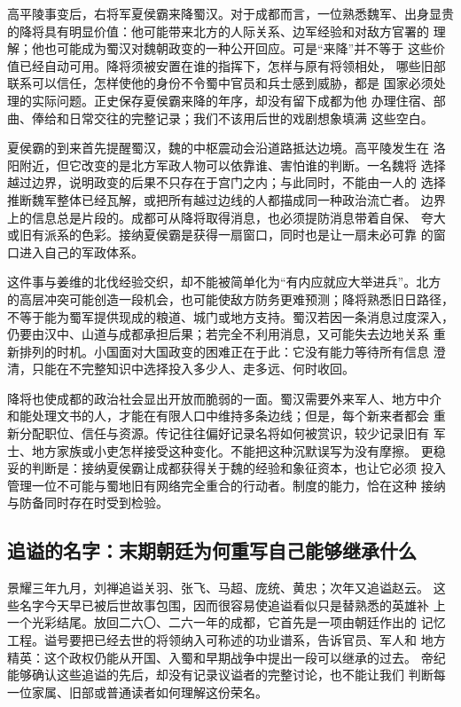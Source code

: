 高平陵事变后，右将军夏侯霸来降蜀汉。对于成都而言，一位熟悉魏军、出身显贵
的降将具有明显价值：他可能带来北方的人际关系、边军经验和对敌方官署的
理解；他也可能成为蜀汉对魏朝政变的一种公开回应。可是“来降”并不等于
这些价值已经自动可用。降将须被安置在谁的指挥下，怎样与原有将领相处，
哪些旧部联系可以信任，怎样使他的身份不令蜀中官员和兵士感到威胁，都是
国家必须处理的实际问题。正史保存夏侯霸来降的年序，却没有留下成都为他
办理住宿、部曲、俸给和日常交往的完整记录；我们不该用后世的戏剧想象填满
这些空白。

夏侯霸的到来首先提醒蜀汉，魏的中枢震动会沿道路抵达边境。高平陵发生在
洛阳附近，但它改变的是北方军政人物可以依靠谁、害怕谁的判断。一名魏将
选择越过边界，说明政变的后果不只存在于宫门之内；与此同时，不能由一人的
选择推断魏军整体已经瓦解，或把所有越过边线的人都描成同一种政治流亡者。
边界上的信息总是片段的。成都可从降将取得消息，也必须提防消息带着自保、
夸大或旧有派系的色彩。接纳夏侯霸是获得一扇窗口，同时也是让一扇未必可靠
的窗口进入自己的军政体系。

这件事与姜维的北伐经验交织，却不能被简单化为“有内应就应大举进兵”。北方
的高层冲突可能创造一段机会，也可能使敌方防务更难预测；降将熟悉旧日路径，
不等于能为蜀军提供现成的粮道、城门或地方支持。蜀汉若因一条消息过度深入，
仍要由汉中、山道与成都承担后果；若完全不利用消息，又可能失去边地关系
重新排列的时机。小国面对大国政变的困难正在于此：它没有能力等待所有信息
澄清，只能在不完整知识中选择投入多少人、走多远、何时收回。

降将也使成都的政治社会显出开放而脆弱的一面。蜀汉需要外来军人、地方中介
和能处理文书的人，才能在有限人口中维持多条边线；但是，每个新来者都会
重新分配职位、信任与资源。传记往往偏好记录名将如何被赏识，较少记录旧有
军士、地方家族或小吏怎样接受这种变化。不能把这种沉默误写为没有摩擦。
更稳妥的判断是：接纳夏侯霸让成都获得关于魏的经验和象征资本，也让它必须
投入管理一位不可能与蜀地旧有网络完全重合的行动者。制度的能力，恰在这种
接纳与防备同时存在时受到检验。

\subsection{追谥的名字：末期朝廷为何重写自己能够继承什么}

景耀三年九月，刘禅追谥关羽、张飞、马超、庞统、黄忠；次年又追谥赵云。
这些名字今天早已被后世故事包围，因而很容易使追谥看似只是替熟悉的英雄补
上一个光彩结尾。放回二六〇、二六一年的成都，它首先是一项由朝廷作出的
记忆工程。谥号要把已经去世的将领纳入可称述的功业谱系，告诉官员、军人和
地方精英：这个政权仍能从开国、入蜀和早期战争中提出一段可以继承的过去。
帝纪能够确认这些追谥的先后，却没有记录议谥者的完整讨论，也不能让我们
判断每一位家属、旧部或普通读者如何理解这份荣名。


